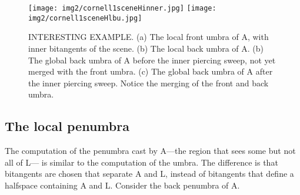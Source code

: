 \documentclass[9pt,twocolumn]{article}
\newif\ifJournal
\begin{document}
\begin{figure}
\begin{center}
\texttt{[image: img2/cornell1sceneHinner.jpg]}
\texttt{[image: img2/cornell1sceneHlbu.jpg]}
\end{center}
\caption{INTERESTING EXAMPLE.
         (a) The local front umbra of A, with inner bitangents of the scene.
         (b) The local back umbra of A.
         (b) The global back umbra of A before the inner piercing sweep, not yet merged
             with the front umbra.
         (c) The global back umbra of A after the inner piercing sweep.
             Notice the merging of the front and back umbra.}
\label{fig:cornell1sceneH}
\end{figure}
\fi

\ifJournal
\begin{figure}
\begin{center}
\texttt{[image: img2/gu2umbra.jpg]}
\end{center}
\caption{This companion paper develops the theory of this image}
\end{figure}

\begin{figure}
\begin{center}
\texttt{[image: img2/vg9global.jpg]}
\texttt{[image: img2/vg900global.jpg]}
\texttt{[image: img2/vg900globalall.jpg]}
\end{center}
\caption{ANOTHER EXAMPLE (POSSIBLY USEFUL): The addition of objects can affect the global umbra: (a) The local umbra of A. (b) The global umbra of A. (c) The global umbra of all objects in the scene.}
\label{fig:globalvg900}
\end{figure}
\fi

\ifJournal
\clearpage

\subsection{The local penumbra}

The computation of the penumbra cast by A---the region that sees some but not all of L---
is similar to the computation of the umbra.
The difference is that bitangents are chosen that separate A and L,
instead of bitangents that define a halfspace containing A and L.
Consider the back penumbra of A.
\end{document}
